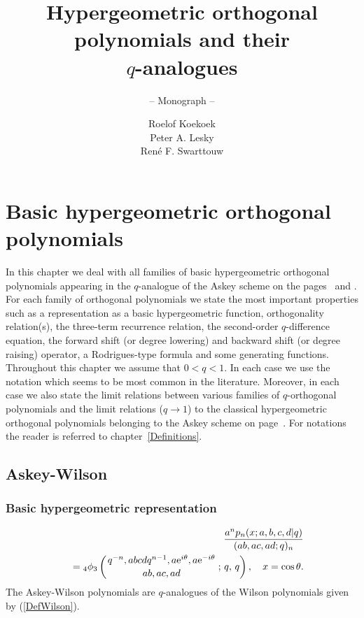\documentclass[envcountchap,graybox]{svmono}
\newcounter{rom}
\newcommand{\qhyp}[5]{\mbox{}_{#1}{\phi}_{#2}
\left(\genfrac{}{}{0pt}{}{#3}{#4}\,;\,q,\,#5\right)}
\newcommand{\e}{\textrm{e}}
\begin{document}
\author{Roelof Koekoek\\[2.5mm]Peter A. Lesky\\[2.5mm]Ren\'e F. Swarttouw}
\title{Hypergeometric orthogonal polynomials and their\\$q$-analogues}
\subtitle{-- Monograph --}
\maketitle

\frontmatter

\large

\addtocounter{chapter}{13}

\chapter{Basic hypergeometric orthogonal polynomials}
\label{BasicHyperOrtPol}


In this chapter we deal with all families of basic hypergeometric orthogonal polynomials
appearing in the $q$-analogue of the Askey scheme on the pages~\pageref{qscheme1} and
\pageref{qscheme2}. For each family of orthogonal polynomials we state the most important
properties such as a representation as a basic hypergeometric function, orthogonality
relation(s), the three-term recurrence relation, the second-order $q$-difference equation,
the forward shift (or degree lowering) and backward shift (or degree raising) operator, a
Rodrigues-type formula and some generating functions. Throughout this chapter we assume
that $0<q<1$. In each case we use the notation which seems to be most common in the
literature. Moreover, in each case we also state the limit relations between various
families of $q$-orthogonal polynomials and the limit relations ($q\rightarrow 1$) to the
classical hypergeometric orthogonal polynomials belonging to the Askey scheme on
page~\pageref{scheme}. For notations the reader is referred to chapter~\ref{Definitions}.


\section{Askey-Wilson}

\subsection*{Basic hypergeometric representation}
\begin{eqnarray}
\label{DefAskeyWilson}
& &\frac{a^np_n(x;a,b,c,d|q)}{(ab,ac,ad;q)_n}\nonumber\\
& &{}=\qhyp{4}{3}{q^{-n},abcdq^{n-1},a\e^{i\theta},a\e^{-i\theta}}{ab,ac,ad}{q},\quad x=\cos\theta.
\end{eqnarray}
The Askey-Wilson polynomials are $q$-analogues of the Wilson polynomials given by (\ref{DefWilson}).
\end{document}
